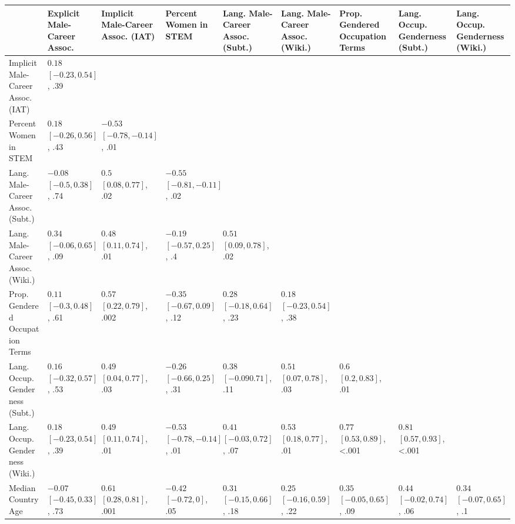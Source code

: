 \documentclass[11pt]{wlscirep}
\begin{document}
\begin{tabular}{lp{1.1cm}p{1.1cm}p{1.1cm}p{1.1cm}p{1.1cm}p{1.1cm}p{1.1cm}p{1.1cm}}
&Explicit Male-Career Assoc. & Implicit Male-Career Assoc. (IAT) & Percent Women in STEM & Lang. Male-Career Assoc. (Subt.) & Lang. Male-Career Assoc. (Wiki.) & Prop. Gendered Occupation Terms & Lang. Occup. Genderness (Subt.) & Lang. Occup. Genderness (Wiki.) \\
\midrule
Implicit Male-Career Assoc. (IAT) & {$0.18$ $[-0.23, 0.54]$, .39}&  & &  &  &  &  &\\
\addlinespace

Percent Women in STEM & $0.18$ $[-0.26, 0.56]$, .43 & $-0.53$  $[-0.78, -0.14]$, .01 & &  & &  &  &    \\
\addlinespace

Lang. Male-Career Assoc. (Subt.) & $-0.08$  $[-0.5, 0.38]$, .74 & $0.5$  $[0.08,  0.77]$, .02 & $-0.55$  $[-0.81, -0.11]$, .02 & &  & &  &  \\
\addlinespace

Lang. Male-Career Assoc. (Wiki.) & $0.34$  $[-0.06, 0.65]$, .09 & $0.48$  $[0.11, 0.74]$, .01 & $-0.19$  $[-0.57, 0.25]$, .4 & $0.51$  $[0.09, 0.78]$, .02 & & & &\\
\addlinespace

Prop. Gendered Occupation Terms & $0.11$  $[-0.3, 0.48]$, .61 & $0.57$  $[0.22,  0.79]$, .002 & $-0.35$  $[-0.67, 0.09]$, .12 & $0.28$  $[-0.18, 0.64]$, .23 & $0.18$  $[-0.23, 0.54]$, .38 &  & &\\
\addlinespace

Lang. Occup. Genderness (Subt.) & $0.16$  $[-0.32, 0.57]$, .53 & $0.49$  $[0.04,  0.77]$, .03 & $-0.26$  $[-0.66, 0.25]$, .31 & $0.38$  $[-0.09 0.71]$, .11 & $0.51$  $[0.07, 0.78]$, .03 & $0.6$  $[0.2, 0.83]$, .01 & & \\
\addlinespace

Lang. Occup. Genderness (Wiki.) & $0.18$  $[-0.23, 0.54]$, .39 & $0.49$  $[0.11,  0.74]$, .01 & $-0.53$  $[-0.78, -0.14]$, .01 & $0.41$  $[-0.03, 0.72]$, .07 & $0.53$  $[0.18, 0.77]$, .01 & $0.77$  $[0.53, 0.89]$, <.001 & $0.81$  $[0.57, 0.93]$, <.001 &\\
\addlinespace

Median Country Age & $-0.07$  $[-0.45, 0.33]$, .73 & $0.61$  $[0.28, 0.81]$, .001 & $-0.42$  $[-0.72, 0]$, .05 & $0.31$  $[-0.15, 0.66]$, .18 & $0.25$  $[-0.16, 0.59]$, .22 & $0.35$  $[-0.05, 0.65]$, .09 & $0.44$  $[-0.02, 0.74]$, .06 & $0.34$  $[-0.07, 0.65]$, .1 \\
\bottomrule
\end{tabular}
\hfill
\null
\end{document}
